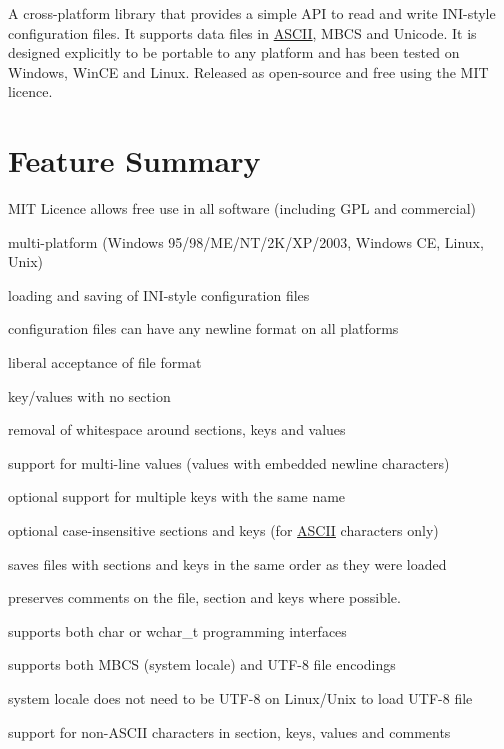 A cross-\/platform library that provides a simple A\+PI to read and write I\+N\+I-\/style configuration files. It supports data files in \hyperlink{a00038}{A\+S\+C\+II}, M\+B\+CS and Unicode. It is designed explicitly to be portable to any platform and has been tested on Windows, Win\+CE and Linux. Released as open-\/source and free using the M\+IT licence.

\section*{Feature Summary}


\begin{DoxyItemize}
\item M\+IT Licence allows free use in all software (including G\+PL and commercial)
\item multi-\/platform (Windows 95/98/\+M\+E/\+N\+T/2\+K/\+X\+P/2003, Windows CE, Linux, Unix)
\item loading and saving of I\+N\+I-\/style configuration files
\item configuration files can have any newline format on all platforms
\item liberal acceptance of file format
\begin{DoxyItemize}
\item key/values with no section
\item removal of whitespace around sections, keys and values
\end{DoxyItemize}
\item support for multi-\/line values (values with embedded newline characters)
\item optional support for multiple keys with the same name
\item optional case-\/insensitive sections and keys (for \hyperlink{a00038}{A\+S\+C\+II} characters only)
\item saves files with sections and keys in the same order as they were loaded
\item preserves comments on the file, section and keys where possible.
\item supports both char or wchar\+\_\+t programming interfaces
\item supports both M\+B\+CS (system locale) and U\+T\+F-\/8 file encodings
\item system locale does not need to be U\+T\+F-\/8 on Linux/\+Unix to load U\+T\+F-\/8 file
\item support for non-\/\+A\+S\+C\+II characters in section, keys, values and comments

\end{DoxyItemize}
